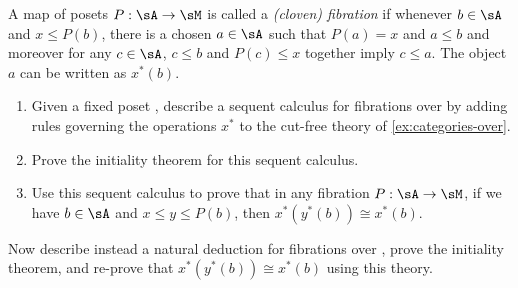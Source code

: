 \documentclass{book}
\begin{document}
\begin{ex}\label{ex:seqcalc-poset-fib}
  A map of posets $P:\sA\to\sM$ is called a \emph{(cloven) fibration} if whenever $b\in\sA$ and $x\le P(b)$, there is a chosen $a\in \sA$ such that $P(a)=x$ and $a\le b$ and moreover for any $c\in\sA$, $c\le b$ and $P(c)\le x$ together imply $c\le a$.
  The object $a$ can be written as $x^*(b)$.
  \begin{enumerate}
  \item Given a fixed poset \sM, describe a sequent calculus for fibrations over \sM by adding rules governing the operations $x^*$ to the cut-free theory of \cref{ex:categories-over}.
  \item Prove the initiality theorem for this sequent calculus.
  \item Use this sequent calculus to prove that in any fibration $P:\sA\to\sM$, if we have $b\in \sA$ and $x\le y\le P(b)$, then $x^*(y^*(b))\cong x^*(b)$.
  \end{enumerate}
\end{ex}

\begin{ex}\label{ex:natded-poset-fib}
  Now describe instead a natural deduction for fibrations over \sM, prove the initiality theorem, and re-prove that $x^*(y^*(b))\cong x^*(b)$ using this theory.
\end{ex}
\end{document}
